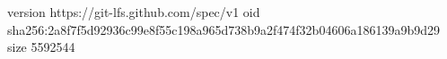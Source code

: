 version https://git-lfs.github.com/spec/v1
oid sha256:2a8f7f5d92936c99e8f55c198a965d738b9a2f474f32b04606a186139a9b9d29
size 5592544

